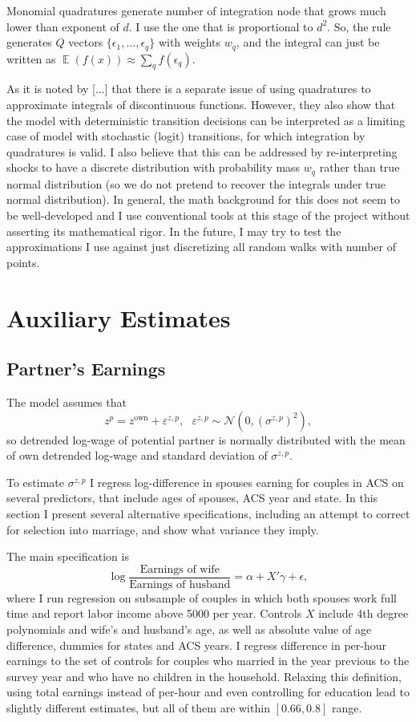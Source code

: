 \documentclass[12pt,letter]{article}
\DeclareMathOperator{\E}{\mathbb{E}}
\begin{document}
Monomial quadratures generate number of integration node that grows much lower than exponent of $d$. I use the one that is proportional to $d^2$. So, the rule generates $Q$ vectors $\{\epsilon_1,...,\epsilon_q\}$ with weights $w_q$, and the integral can just be written as $\E(f(x))\approx \sum_{q} f(\epsilon_q)$.

As it is noted by [...] that there is a separate issue of using quadratures to approximate integrals of discontinuous functions. However, they also show that the model with deterministic transition decisions can be interpreted as a limiting case of model with stochastic (logit) transitions, for which integration by quadratures is valid. I also believe that this can be addressed by re-interpreting shocks to have a discrete distribution with probability mass $w_q$ rather than true normal distribution (so we do not pretend to recover the integrals under true normal distribution). In general, the math background for this does not seem to be well-developed and I use conventional tools at this stage of the project without asserting its mathematical rigor. In the future, I may try to test the approximations I use against just discretizing all random walks with number of points.

\section{Auxiliary Estimates}
\subsection{Partner's Earnings\label{partearn}}
The model assumes that
\[ z^p = z^{\text{own}} + \varepsilon^{z,p}, \ \ \ \varepsilon^{z,p}\sim\mathcal{N}(0,(\sigma^{z,p})^2),\]
so detrended log-wage of potential partner is normally distributed with the mean of own detrended log-wage and standard deviation of $\sigma^{z,p}$.

To estimate $\sigma^{z,p}$ I regress log-difference in spouses earning for couples in ACS on several predictors, that include ages of spouses, ACS year and state. In this section I present several alternative specifications, including an attempt to correct for selection into marriage, and show what variance they imply. 

The main specification is
\[\log \frac{\text{Earnings of wife}}{\text{Earnings of husband}} = \alpha + X'\gamma + \epsilon,\]
where I run regression on subsample of couples in which both spouses work full time and report labor income above 5000 per year.  Controls $X$ include 4th degree polynomials and wife's and husband's age, as well as absolute value of age difference, dummies for states and ACS years. I regress difference in per-hour earnings to the set of controls for couples who married in the year previous to the survey year and who have no children in the household. Relaxing this definition, using total earnings instead of per-hour and even controlling for education lead to slightly different estimates, but all of them are within $[0.66,0.8]$ range.
\end{document}
